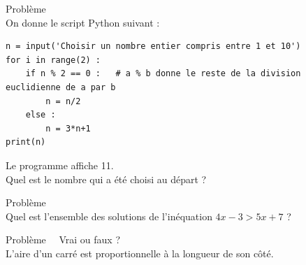 \documentclass[a4paper,11pt,exos]{nsi} %
\newcounter{pbNum}
\newcommand{\pb}[1]
{
	\addtocounter{pbNum}{1}
	{\titlefont\color{UGLiBlue}\Large Problème\ \thepbNum\ \normalsize{#1}}\smallskip	
}
\begin{document}
\pb{}\\
On donne le script Python suivant :
\begin{pyc}
    \begin{verbatim}
n = input('Choisir un nombre entier compris entre 1 et 10')
for i in range(2) :
    if n % 2 == 0 :   # a % b donne le reste de la division euclidienne de a par b
        n = n/2
    else :
        n = 3*n+1
print(n)
    \end{verbatim}
\end{pyc}

Le programme affiche 11.\\
Quel est le nombre qui a été choisi au départ ?\\

\pb{}\\
Quel est l’ensemble des solutions de l’inéquation $4x-3>5x+7$ ?\\

\pb{ Vrai ou faux ?}\\
L’aire d’un carré est proportionnelle à la longueur de son côté.
\end{document}
